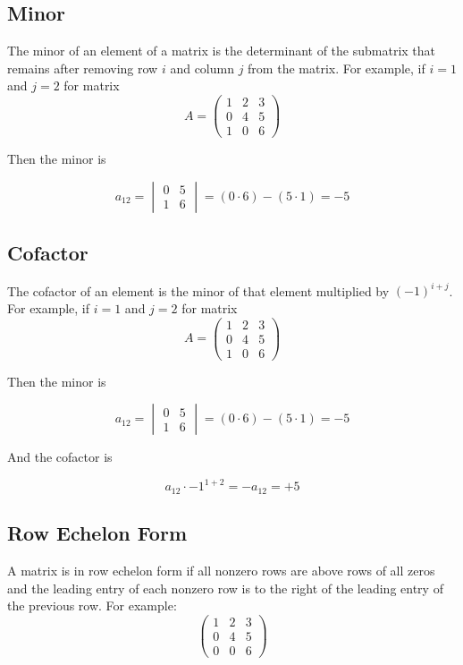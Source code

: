\documentclass[12pt]{article}
\begin{document}
\subsection{Minor}
The minor of an element of a matrix is the determinant of the submatrix that remains after removing row \(i\) and column \(j\) from the matrix. For example, if \(i=1\) and \(j=2\) for matrix 
\[ A = \begin{pmatrix} 1 & 2 & 3 \\ 0 & 4 & 5 \\ 1 & 0 & 6 \end{pmatrix} \]

Then the minor is

\[a_{12} = \begin{vmatrix} 0 & 5 \\ 1 & 6 \end{vmatrix} = (0 \cdot 6) - (5 \cdot 1) = -5\]

\subsection{Cofactor}
The cofactor of an element is the minor of that element multiplied by \( (-1)^{i+j} \). For example,  if \(i=1\) and \(j=2\) for matrix 
\[ A = \begin{pmatrix} 1 & 2 & 3 \\ 0 & 4 & 5 \\ 1 & 0 & 6 \end{pmatrix} \]

Then the minor is

\[a_{12} = \begin{vmatrix} 0 & 5 \\ 1 & 6 \end{vmatrix} = (0 \cdot 6) - (5 \cdot 1) = -5\]

And the cofactor is 

\[a_{12}\cdot -1^{1 + 2} = -a_{12} = +5\]


\subsection{Row Echelon Form}
A matrix is in row echelon form if all nonzero rows are above rows of all zeros and the leading entry of each nonzero row is to the right of the leading entry of the previous row.
For example:
\[ \begin{pmatrix} 1 & 2 & 3 \\ 0 & 4 & 5 \\ 0 & 0 & 6 \end{pmatrix} \]
\end{document}
